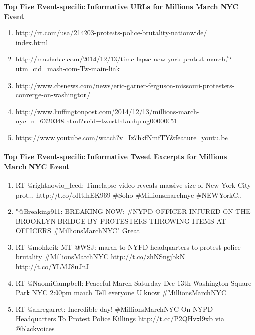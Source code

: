 \textbf{Top Five Event-specific Informative URLs for Millions March NYC Event}
\begin{enumerate}
\item http://rt.com/usa/214203-protests-police-brutality-nationwide/\\index.html
\item http://mashable.com/2014/12/13/time-lapse-new-york-protest-march/?utm\_cid=mash-com-Tw-main-link
\item http://www.cbsnews.com/news/eric-garner-ferguson-missouri-protesters-converge-on-washington/
\item http://www.huffingtonpost.com/2014/12/13/millions-march-nyc\_n\_6320348.html?ncid=tweetlnkushpmg00000051 
\item https://www.youtube.com/watch?v=Iz7hkfNmfTY\&feature=youtu.be                                                                                                                                                                                                                                                                                                                                                                                                                                                                                           
\end{enumerate}

\paragraph{Top Five Event-specific Informative Tweet Excerpts for Millions March NYC Event}
\begin{enumerate}
\item RT @rightnowio\_feed: Timelapse video reveals massive size of New York City prot... http://t.co/oHtIhEK969 \#Soho \#Millionsmarchnyc \#NEWYorkC..
\item "@Breaking911: BREAKING NOW: \#NYPD OFFICER INJURED ON THE BROOKLYN BRIDGE BY PROTESTERS THROWING ITEMS AT OFFICERS \#MillionsMarchNYC" Great
\item RT @mohkeit: MT @WSJ: march to NYPD headquarters to protest police brutality \#MillionsMarchNYC http://t.co/zhNSngjbkN http://t.co/YLMJ8uJnJ
\item RT @NaomiCampbell: Peaceful March Saturday Dec 13th Washington Square Park NYC 2:00pm march   Tell everyone U know \#MillionsMarchNYC
\item RT @anregarret: Incredible day! \#MillionsMarchNYC On NYPD Headquarters To Protest Police Killings http://t.co/P2QHvxl9xb via @blackvoices \end{enumerate}

